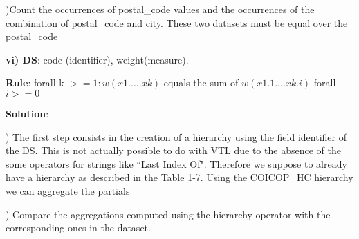 )Count the occurrences of postal\_code values and the occurrences of the combination of postal\_code and city. These two datasets must be equal over the postal\_code


\begin{table}
\begin{center}
\footnotesize
{}
\caption{Translation of example v)}
\centering
\label{Tab1-6}
\end{center}
\end{table}



\bigskip\noindent
\textbf{vi) DS}: code (identifier), weight(measure). 

\bigskip\noindent
\textbf{Rule}: forall k $>= 1: w(x1. ... .xk)$ equals the sum of $ w(x1.1 ... .xk.i) $ forall $ i >= 0 $

\bigskip\noindent
\textbf{Solution}:

) The first step consists in the creation of a hierarchy using the field identifier of the DS. This is not actually possible to do with VTL due to the absence of the some operators for strings like ``Last Index Of". Therefore we suppose to already have a hierarchy as described in the Table 1-7. Using the COICOP\_HC  hierarchy we can aggregate the partials 

) Compare the aggregations computed using the hierarchy operator with the corresponding ones in the dataset. 

